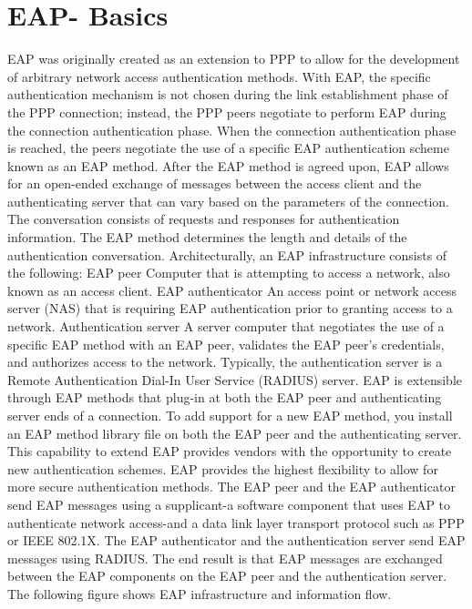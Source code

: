 \section{EAP- Basics}

EAP was originally created as an extension to PPP to allow for the development of arbitrary network access authentication methods. With EAP, the specific authentication mechanism is not chosen during the link establishment phase of the PPP connection; instead, the PPP peers negotiate to perform EAP during the connection authentication phase. When the connection authentication phase is reached, the peers negotiate the use of a specific EAP authentication scheme known as an EAP method. After the EAP method is agreed upon, EAP allows for an open-ended exchange of messages between the access client and the authenticating server that can vary based on the parameters of the connection. The conversation consists of requests and responses for authentication information. The EAP method determines the length and details of the authentication conversation. Architecturally, an EAP infrastructure consists of the following:
EAP peer Computer that is attempting to access a network, also known as an access client. EAP authenticator An access point or network access server (NAS) that is requiring EAP authentication prior to granting access to a network. Authentication server A server computer that negotiates the use of a specific EAP method with an EAP peer, validates the EAP peer's credentials, and authorizes access to the network. Typically, the authentication server is a Remote Authentication Dial-In User Service (RADIUS) server. EAP is extensible through EAP methods that plug-in at both the EAP peer and authenticating server ends of a connection. To add support for a new EAP method, you install an EAP method library file on both the EAP peer and the authenticating server. This capability to extend EAP provides vendors with the opportunity to create new authentication schemes. EAP provides the highest flexibility to allow for more secure authentication methods. The EAP peer and the EAP authenticator send EAP messages using a supplicant-a software component that uses EAP to authenticate network access-and a data link layer transport protocol such as PPP or IEEE 802.1X. The EAP authenticator and the authentication server send EAP messages using RADIUS. The end result is that EAP messages are exchanged between the EAP components on the EAP peer and the authentication server. The following figure shows EAP infrastructure and information flow.

